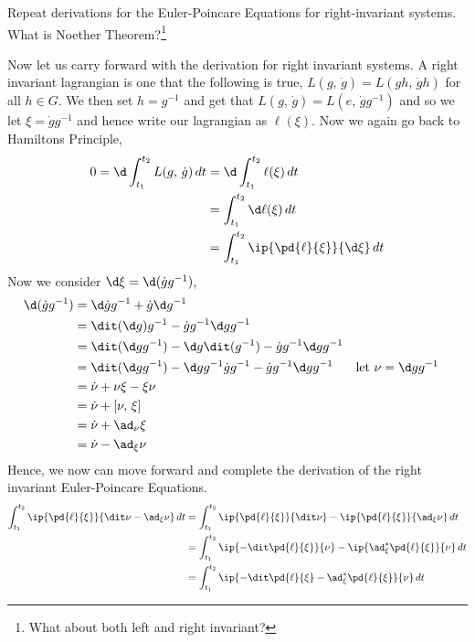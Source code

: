 \begin{exercise}
  Repeat derivations for the Euler-Poincare Equations for right-invariant systems. What is Noether Theorem?\footnote{What about both left and right invariant?}
\end{exercise}
{\color{red} \begin{solution}
  Now let us carry forward with the derivation for right invariant systems. A right invariant lagrangian is one that the following is true, $L(g,\,\dot g) = L(gh,\,\dot gh)$ for all $h \in G$. We then set $h = g^{-1}$ and get that $L(g,\,\dot g) = L(e,\,\dot gg^{-1})$ and so we let $\xi = \dot gg^{-1}$ and hence write our lagrangian as $\ell(\xi)$. Now we again go back to Hamiltons Principle,
  \begin{align*}
    0 = \d\int_{t_1}^{t_2} L(g,\,\dot g)\,dt &= \d\int_{t_1}^{t_2} \ell(\xi)\,dt\\
    &= \int_{t_1}^{t_2} \d\ell(\xi)\,dt \\
    &= \int_{t_1}^{t_2} \ip{\pd{\ell}{\xi}}{\d\xi}\,dt \\
  \end{align*}
  Now we consider $\d\xi = \d(\dot g g^{-1})$,
  \begin{align*}
    \d(\dot g g^{-1}) &= \d\dot g g^{-1} + \dot g\d g^{-1} \\
    &= \dit(\d g)g^{-1} - \dot g g^{-1}\d gg^{-1}\\
    &= \dit(\d g g^{-1}) - \d g\dit(g^{-1}) - \dot g g^{-1}\d gg^{-1}\\
    &= \dit(\d g g^{-1}) - \d gg^{-1}\dot g g^{-1} - \dot g g^{-1}\d gg^{-1} && \text{let $\nu = \d gg^{-1}$}\\
    &= \dot\nu + \nu\xi - \xi\nu \\
    &= \dot\nu + [\nu,\,\xi] \\
    &= \dot \nu + \ad_\nu\xi \\
    &= \dot\nu - \ad_\xi\nu
  \end{align*}
  Hence, we now can move forward and complete the derivation of the right invariant Euler-Poincare Equations.
  \begin{align*}
    \int_{t_1}^{t_2} \ip{\pd{\ell}{\xi}}{\dit\nu - \ad_\xi\nu}\,dt &= \int_{t_1}^{t_2} \ip{\pd{\ell}{\xi}}{\dit\nu} - \ip{\pd{\ell}{\xi}}{\ad_\xi\nu}\,dt \\
    &= \int_{t_1}^{t_2} \ip{-\dit\pd{\ell}{\xi}}{\nu} - \ip{\ad^*_\xi\pd{\ell}{\xi}}{\nu}\,dt \\
    &= \int_{t_1}^{t_2} \ip{-\dit\pd{\ell}{\xi} -\ad^*_\xi\pd{\ell}{\xi}}{\nu}\,dt

\end{align*}
\end{solution}}
